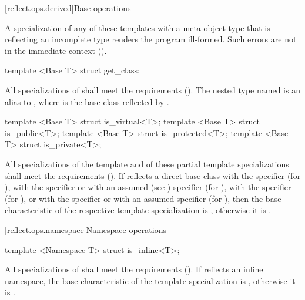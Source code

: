 [reflect.ops.derived]{Base operations}

\begin{std.txt}\color{addclr}
A specialization of any of these templates with a meta-object type that is reflecting an incomplete type renders the program ill-formed.
      Such errors are not in the immediate context ().

\begin{itemdecl}
template <Base T> struct get_class;
\end{itemdecl}

\begin{itemdescr}
\pnum
All specializations of  shall meet the  requirements (). The nested type named  is an alias to , where  is the base class reflected by .
\end{itemdescr}

\begin{itemdecl}
template <Base T> struct is_virtual<T>;
template <Base T> struct is_public<T>;
template <Base T> struct is_protected<T>;
template <Base T> struct is_private<T>;
\end{itemdecl}

\begin{itemdescr}
\pnum
All specializations of the template and of these partial template specializations shall meet the  requirements (). If  reflects a direct base class with the  specifier (for ), with the  specifier or with an assumed (see )  specifier (for ), with the  specifier (for ), or with the  specifier or with an assumed  specifier (for ), then the base characteristic of the respective template specialization is , otherwise it is .
\end{itemdescr}
\end{std.txt}

[reflect.ops.namespace]{Namespace operations}

\begin{std.txt}\color{addclr}

\begin{itemdecl}
template <Namespace T> struct is_inline<T>;
\end{itemdecl}

\begin{itemdescr}
\pnum
All specializations of  shall meet the  requirements (). If  reflects an inline namespace, the base characteristic of the template specialization is , otherwise it is .

\end{itemdescr}
\end{std.txt}

